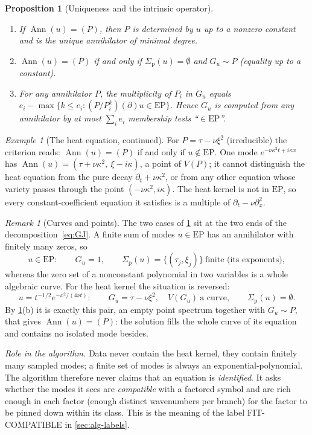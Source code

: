 \documentclass[11pt]{article}
\theoremstyle{plain}
\newtheorem{proposition}[theorem]{Proposition}
\theoremstyle{definition}
\theoremstyle{remark}
\newtheorem{remark}[theorem]{Remark}
\newtheorem{example}[theorem]{Example}
\DeclareMathOperator{\Ann}{Ann}             %
\newcommand{\Var}{V}                        %
\newcommand{\EP}{\mathrm{EP}}               %
\newcommand{\Gu}{G_u}                       %
\newcommand{\sigp}{\Sigma_{\mathrm p}}      %
\newcommand{\lab}[1]{\textsf{#1}}           %
\newcommand{\FC}{\lab{FIT-COMPATIBLE}}
\newcommand{\roleinalg}[1]{\par\noindent\emph{Role in the algorithm.} #1\par}
\begin{document}
\begin{proposition}[Uniqueness and the intrinsic operator]\label{prop:unique}
\begin{enumerate}[label=(\alph*)]
  \item If $\Ann(u)=(P)$, then $P$ is determined by $u$ up to a nonzero constant and is the unique
  annihilator of minimal degree.
  \item $\Ann(u)=(P)$ if and only if $\sigp(u)=\emptyset$ and $\Gu\sim P$ (equality up to a constant).
  \item For any annihilator $P$, the multiplicity of $P_i$ in $\Gu$ equals $e_i-\max\{k\le e_i:
  (P/P_i^{k})(\partial)u\in\EP\}$. Hence $\Gu$ is computed from any annihilator by at most
  $\sum_ie_i$ membership tests ``$\in\EP$''.
\end{enumerate}
\end{proposition}

\begin{example}[The heat equation, continued]\label{ex:heat-ident}
For $P=\tau-\nu\xi^2$ (irreducible) the criterion reads: $\Ann(u)=(P)$ if and only if $u\notin\EP$.
One mode $e^{-\nu\kappa^2t+i\kappa x}$ has $\Ann(u)=(\tau+\nu\kappa^2,\ \xi-i\kappa)$, a point of
$\Var(P)$; it cannot distinguish the heat equation from the pure decay $\partial_t+\nu\kappa^2$, or from
any other equation whose variety passes through the point $(-\nu\kappa^2,i\kappa)$. The heat kernel is not in $\EP$, so every
constant-coefficient equation it satisfies is a multiple of $\partial_t-\nu\partial_x^2$.
\end{example}

\begin{remark}[Curves and points]\label{rem:curves-points}
The two cases of \cref{ex:heat-ident} sit at the two ends of the decomposition~\eqref{eq:GJ}. A finite sum of modes
$u\in\EP$ has an annihilator with finitely many zeros, so
\[
  u\in\EP:\qquad \Gu=1,\qquad \sigp(u)=\{(\tau_j,\xi_j)\}\ \text{finite (its exponents)},
\]
whereas the zero set of a nonconstant polynomial in two variables is a whole algebraic curve. For the heat kernel
the situation is reversed:
\[
  u=t^{-1/2}e^{-x^2/(4\nu t)}:\qquad \Gu=\tau-\nu\xi^2,\quad \Var(\Gu)\ \text{a curve},\qquad \sigp(u)=\emptyset .
\]
By \cref{prop:unique}(b) it is exactly this pair, an empty point spectrum together with $\Gu\sim P$, that gives
$\Ann(u)=(P)$: the solution fills the whole curve of its equation and contains no isolated mode besides.
\end{remark}

\roleinalg{Data never contain the heat kernel, they contain finitely many sampled modes; a finite
set of modes is always an exponential-polynomial. The algorithm therefore never claims that an
equation is \emph{identified}. It asks whether the modes it sees are \emph{compatible} with a factored
symbol and are rich enough in each factor (enough distinct wavenumbers per branch) for the factor to
be pinned down within its class. This is the meaning of the label \FC{} in \cref{sec:alg-labels}.}
\end{document}
